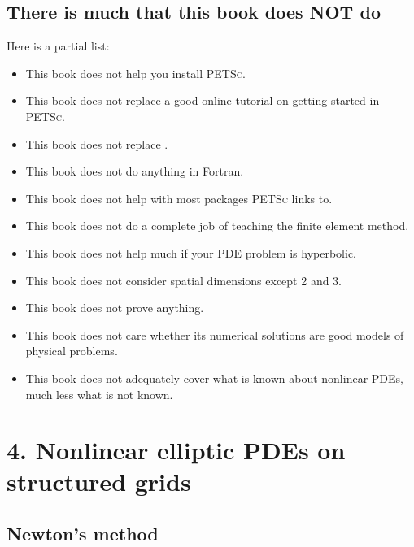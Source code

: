 \documentclass{tufte-book}
\theoremstyle{definition}
\newcommand{\PETSc}{\textsc{PETSc}\xspace}
\begin{document}
\section{There is much that this book does NOT do}

Here is a partial list:\begin{itemize}
\item This book does not help you install \PETSc.
\item This book does not replace a good online tutorial on getting started in \PETSc.
\item This book does not replace \citep{Smithetal1996}.
\item This book does not do anything in Fortran.
\item This book does not help with most packages \PETSc links to.
\item This book does not do a complete job of teaching the finite element method.
\item This book does not help much if your PDE problem is hyperbolic.
\item This book does not consider spatial dimensions except 2 and 3.
\item This book does not prove anything.
\item This book does not care whether its numerical solutions are good models of physical problems.
\item This book does not adequately cover what is known about nonlinear PDEs, much less what is not known.
\end{itemize}


\mainmatter








\chapter{4. Nonlinear elliptic PDEs on structured grids}

\section{Newton's method}
\end{document}

